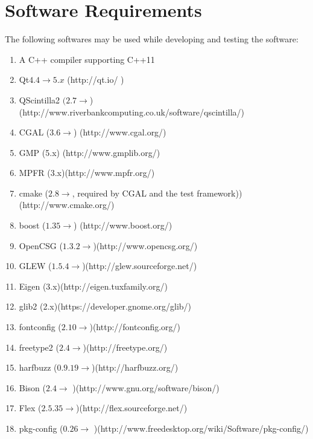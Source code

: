 \section{Software Requirements}
The following softwares may be used while developing and testing the software:
\begin{enumerate} 
	\item A C++ compiler supporting C++11
	
	\item Qt$  4.4 \rightarrow 5.x $ (http://qt.io/ )
	
	\item QScintilla2 $ (2.7 \rightarrow $)(http://www.riverbankcomputing.co.uk/software/qscintilla/)
	
	\item CGAL ($ 3.6 \rightarrow $) (http://www.cgal.org/)
	
	\item GMP (5.x) (http://www.gmplib.org/)
	
	\item MPFR (3.x)(http://www.mpfr.org/)
	
	\item cmake ($ 2.8 \rightarrow $, required by CGAL and the test framework))(http://www.cmake.org/)
	
	\item boost ($ 1.35 \rightarrow $) (http://www.boost.org/)
	
	\item OpenCSG ($ 1.3.2 \rightarrow $)(http://www.opencsg.org/)
	
	\item GLEW ($ 1.5.4 \rightarrow $)(http://glew.sourceforge.net/)
	
	\item Eigen (3.x)(http://eigen.tuxfamily.org/)
	
	\item glib2 (2.x)(https://developer.gnome.org/glib/)
	
	\item fontconfig ($ 2.10 \rightarrow  $)(http://fontconfig.org/)
	
	\item freetype2 ($ 2.4 \rightarrow  $)(http://freetype.org/)
	
	\item harfbuzz ($ 0.9.19 \rightarrow  $)(http://harfbuzz.org/)
	
	\item Bison ($ 2.4 \rightarrow $ )(http://www.gnu.org/software/bison/)
	
	\item Flex ($ 2.5.35 \rightarrow  $)(http://flex.sourceforge.net/)
	
	\item pkg-config ($ 0.26 \rightarrow $ )(http://www.freedesktop.org/wiki/Software/pkg-config/)
	
\end{enumerate}

